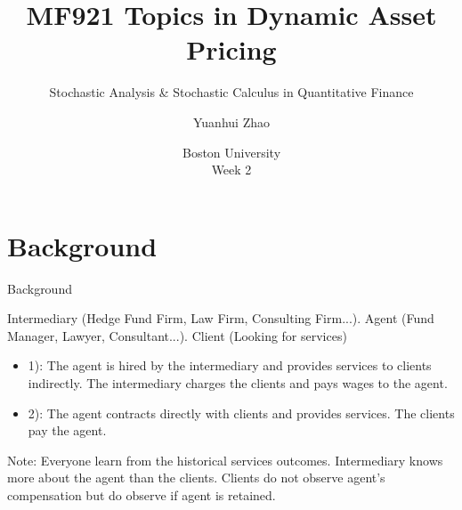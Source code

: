 \documentclass{beamer}
\title{MF921 Topics in Dynamic Asset Pricing}
\subtitle{Stochastic Analysis \& Stochastic Calculus in Quantitative Finance}
\author{Yuanhui Zhao}
\date{Boston University\\Week 2}
\begin{document}
\frame{\titlepage}
\section{Background}
\begin{frame}{Background}
\par Intermediary (Hedge Fund Firm, Law Firm, Consulting Firm...). Agent (Fund Manager, Lawyer, Consultant...). Client (Looking for services)
\vspace{2em}
\begin{itemize}
    \item 1): The agent is hired by the intermediary and provides services to clients indirectly. The intermediary charges the clients and pays wages to the agent.
    \vspace{1em}
    \item 2): The agent contracts directly with clients and provides services. The clients pay the agent.
\end{itemize}
\vspace{1em}
\par Note: Everyone learn from the historical services outcomes. Intermediary knows more about the agent than the clients. Clients do not observe agent's compensation but do observe if agent is retained.
\end{frame}
\end{document}
